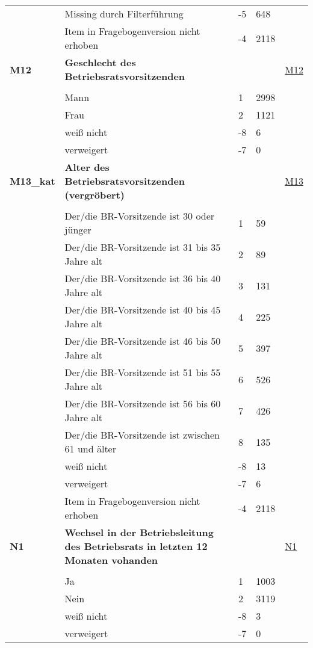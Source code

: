 \begin{longtable}{| L{2.5cm} | L{8.25cm}| C{1.5cm} | R{1.25cm} | C{2.25cm} |  }
   & Missing durch Filterführung & -5 & 648 &  \\ 
   & Item in Fragebogenversion nicht erhoben & -4 & 2118 &  \\ 
   \midrule
\textbf{M12}\label{var:suf:M12} & \textbf{Geschlecht des Betriebsratsvorsitzenden} &  &  & \hyperref[M12]{M12} \\ 
   &  &  &  &  \\ 
   & Mann & 1 & 2998 &  \\ 
   & Frau & 2 & 1121 &  \\ 
   & weiß nicht & -8 & 6 &  \\ 
   & verweigert & -7 & 0 &  \\ 
   \midrule
\textbf{M13\_kat}\label{var:suf:M13:kat} & \textbf{Alter des Betriebsratsvorsitzenden (vergröbert)} &  &  & \hyperref[M13]{M13} \\ 
   &  &  &  &  \\ 
   & Der/die BR-Vorsitzende ist 30 oder jünger & 1 & 59 &  \\ 
   & Der/die BR-Vorsitzende ist 31 bis 35 Jahre alt & 2 & 89 &  \\ 
   & Der/die BR-Vorsitzende ist 36 bis 40 Jahre alt & 3 & 131 &  \\ 
   & Der/die BR-Vorsitzende ist 40 bis 45 Jahre alt & 4 & 225 &  \\ 
   & Der/die BR-Vorsitzende ist 46 bis 50 Jahre alt & 5 & 397 &  \\ 
   & Der/die BR-Vorsitzende ist 51 bis 55 Jahre alt & 6 & 526 &  \\ 
   & Der/die BR-Vorsitzende ist 56 bis 60 Jahre alt & 7 & 426 &  \\ 
   & Der/die BR-Vorsitzende ist zwischen 61 und älter & 8 & 135 &  \\ 
   & weiß nicht & -8 & 13 &  \\ 
   & verweigert & -7 & 6 &  \\ 
   & Item in Fragebogenversion nicht erhoben & -4 & 2118 &  \\ 
   \midrule
\textbf{N1}\label{var:suf:N1} & \textbf{Wechsel in der Betriebsleitung des Betriebsrats in letzten 12 Monaten vohanden} &  &  & \hyperref[N1]{N1} \\ 
   &  &  &  &  \\ 
   & Ja & 1 & 1003 &  \\ 
   & Nein & 2 & 3119 &  \\ 
   & weiß nicht & -8 & 3 &  \\ 
   & verweigert & -7 & 0 &  \\ 

\end{longtable}
